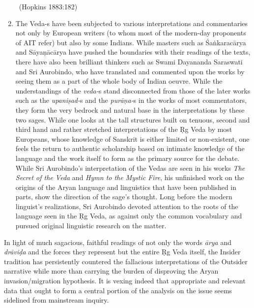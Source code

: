 \begin{enumerate}
\begin{myquote}
~\hfill (Hopkins 1883:182)
\end{myquote}


 \item The Veda-s have been subjected to various interpretations and commentaries not only by European writers (to whom most of the modern-day proponents of AIT refer) but also by some Indians. While masters such as Śaṅkaracārya and Sāyaṇācārya have pushed the boundaries with their readings of the texts, there have also been brilliant thinkers such as Swami Dayananda Saraswati and Sri Aurobindo, who have translated and commented upon the works by seeing them as a part of the whole body of Indian oeuvre. While the understandings of the \textit{veda-}s stand disconnected from those of the later works such as the \textit{upaniṣad-}s and the \textit{purāṇa-}s in the works of most commentators, they form the very bedrock and natural base in the interpretations by these two sages. While one looks at the tall structures built on tenuous, second and third hand and rather stretched interpretations of the Ṛg Veda by most Europeans, whose knowledge of Sanskrit is either limited or non-existent, one feels the return to authentic scholarship based on intimate knowledge of the language and the work itself to form as the primary source for the debate. While Sri Aurobindo’s interpretation of the Vedas are seen in his works \textit{The Secret of the Veda} and \textit{Hymn to the Mystic Fire}, his unfinished work on the origins of the Aryan language and linguistics that have been published in parts, show the direction of the sage’s thought. Long before the modern linguist’s realizations, Sri Aurobindo devoted attention to the roots of the language seen in the Ṛg Veda, as against only the common vocabulary and pursued original linguistic research on the matter.

\end{enumerate}

In light of much sagacious, faithful readings of not only the words \textit{ārya} and \textit{drāviḍa} and the forces they represent but the entire Ṛg Veda itself, the Insider tradition has persistently countered the fallacious interpretations of the Outsider narrative while more than carrying the burden of disproving the Aryan invasion/migration hypothesis. It is vexing indeed that appropriate and relevant data that ought to form a central portion of the analysis on the issue seems sidelined from mainstream inquiry.


